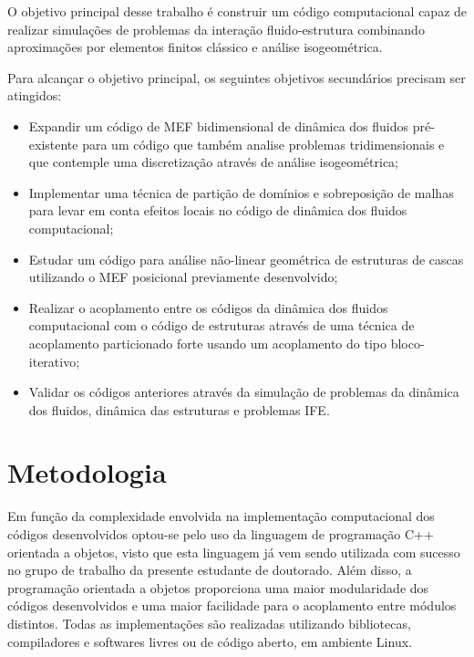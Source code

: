 \documentclass[tese_patricia.tex]{subfiles}
\begin{document}
O objetivo principal desse trabalho é construir um código computacional capaz de realizar simulações de problemas da interação fluido-estrutura combinando aproximações por elementos finitos clássico e análise isogeométrica.

Para alcançar o objetivo principal, os seguintes objetivos secundários precisam ser atingidos:

\begin{itemize}
	\item Expandir um código de MEF bidimensional de dinâmica dos fluidos pré-existente para um código que também analise problemas tridimensionais e que contemple uma discretização através de análise isogeométrica;
	\item Implementar uma técnica de partição de domínios e sobreposição de malhas para levar em conta efeitos locais no código de dinâmica dos fluidos computacional;
	\item Estudar um código para análise não-linear geométrica de estruturas de cascas utilizando o MEF posicional previamente desenvolvido;
	\item Realizar o acoplamento entre os códigos da dinâmica dos fluidos computacional com o código de estruturas através de uma técnica de acoplamento particionado forte usando um acoplamento do tipo bloco-iterativo;
	\item  Validar os códigos anteriores através da simulação de problemas da dinâmica dos fluidos, dinâmica das estruturas e problemas IFE.
\end{itemize}

\section[Metodologia]{Metodologia} 

Em função da complexidade envolvida na implementação computacional dos códigos desenvolvidos optou-se pelo uso da linguagem de programação C++ orientada a objetos, visto que esta linguagem já vem sendo utilizada com sucesso no grupo de trabalho da presente estudante de doutorado. Além disso, a programação orientada a objetos proporciona uma maior modularidade dos códigos desenvolvidos e uma maior facilidade para o acoplamento entre módulos distintos.  Todas as implementações são realizadas utilizando bibliotecas, compiladores e softwares livres ou de código aberto, em ambiente Linux.
\end{document}
